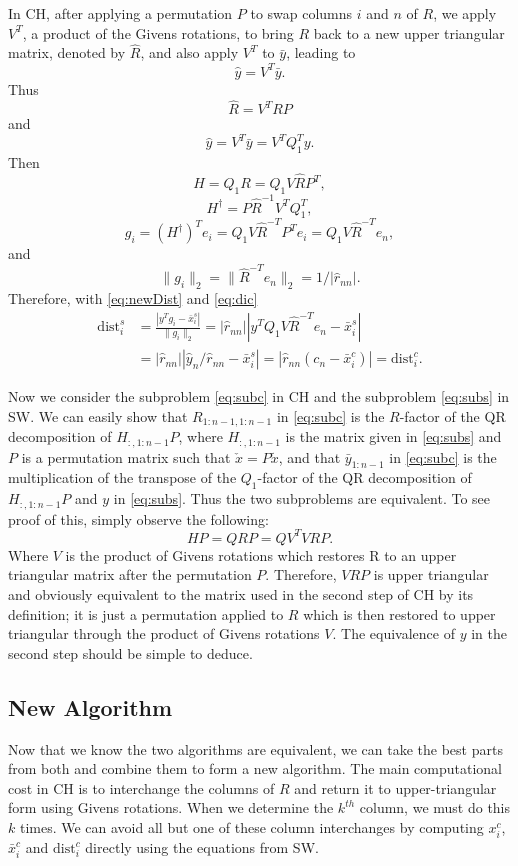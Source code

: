 \documentclass[12pt,Bold,letterpaper]{mcgilletdclass}
\newcommand{\dist}{\mathrm{dist}}
\newcommand{\vsp}{\vspace{\baselineskip}}
\begin{document}
In CH, after applying a permutation $P$ to swap columns $i$ and $n$ of $R$,  
we apply $V^T$, a product of the Givens rotations, to bring $R$ back to a new upper triangular
matrix, denoted by $\hat{R}$, and also apply $V^T$ to $\bar{y}$, 
leading to  $$\hat{y} = V^T\bar{y}.$$
Thus  $$\hat{R}=V^T RP$$ and $$\hat{y} = V^T\bar{y}=V^TQ_1^Ty.$$
Then $$H=Q_1R= Q_1V\hat{R}P^T,$$ $$H^\dag= P\hat{R}^{-1}V^TQ_1^T,$$ 
$$g_i=(H^\dag)^Te_i=Q_1V\hat{R}^{-T}P^Te_i=Q_1V\hat{R}^{-T}e_n,$$
and $$\|g_i\|_2=\|\hat{R}^{-T}e_n\|_2=1/|\hat{r}_{nn}|.$$
Therefore, with \eqref{eq:newDist} and \eqref{eq:dic}
\begin{align}
\dist_i^s
&=\frac{ | y^Tg_i - \bar{x}_i^s   |}{  \| g_i   \|_2} 
=|\hat{r}_{nn}||y^TQ_1V\hat{R}^{-T}e_n- \bar{x}_i^s  |  \label{eq:disc} \\
& = |\hat{r}_{nn}|| \hat{y}_n/\hat{r}_{nn} - \bar{x}_i^s | 
 = |\hat{r}_{nn}(c_n-\bar{x}_i^c)| =\dist_i^c.  \nonumber
\end{align}

Now we consider  the subproblem \eqref{eq:subc} in CH and the subproblem \eqref{eq:subs} in SW.
We can easily show that $R_{1:n-1,1:n-1}$ in  \eqref{eq:subc} is the $R$-factor of the QR decomposition
of $H_{:,1:n-1}P$, where $H_{:,1:n-1}$ is the matrix given in \eqref{eq:subs}
and $P$ is a permutation matrix such that $\check{x}=P\tilde{x}$,
and that $\bar{y}_{1:n-1}$ in  \eqref{eq:subc} is the multiplication of the transpose of 
the $Q_1$-factor of the QR decomposition of $H_{:,1:n-1}P$ and $y$ in \eqref{eq:subs}.
Thus the two subproblems are equivalent. To see proof of this, simply observe the following:
$$
HP = QRP = QV^TVRP.
$$
Where $V$ is the product of Givens rotations which restores R to an upper triangular matrix after the permutation $P$. Therefore, $VRP$ is upper triangular and obviously equivalent to the matrix used in the second step of CH by its definition; it is just a permutation applied to $R$ which is then restored to upper triangular through the product of Givens rotations $V$. The equivalence of $y$ in the second step should be simple to deduce.

\vsp \subsection{New Algorithm} \label{subsec:newReduction}
Now that we know the two algorithms are equivalent, we can take the best
parts from both and combine them to form a new algorithm. 
The main computational cost in CH is to interchange the columns of $R$ and return it to
upper-triangular form using Givens rotations. 
When we determine the $k^{th}$ column,  we must do this $k$ times. 
We can avoid all but one of these column interchanges by computing $x_i^c$, 
$\bar{x}_i^c$ and $\dist_i^c$ directly using the equations from SW. 
\end{document}
